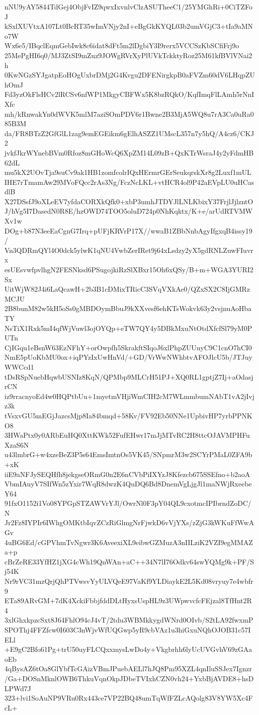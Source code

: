 nNU9yAY5844TdGej4ObjFvIZ9qwxIxvnlvClzASUTheeC1/25YMGhRi+0CiTZFoJ
kSxlXUVtxA107Lt0BcRT35wImVNjy2nI+eBgGkKYQL03b2umVGjC3+tIa9aMNo7W
Wx6e5/IBqclEqmGebIwk8c6idat8dFt5m2lDgbiY3I9rerx5VCCSzKbSCfiFrj9o
25MePgHI6q0/MJ3ZtSI9mZuz9JOWgRVrXyPlUVkTckktyRoz25M61kfBVlVNai2h
0KwNGzSYJgatpEoHOgUxbrDMj2G4Kvgu2DFENirgkpB0aFVZm60dV6LHqpZUhOmJ
Fd3yzOkFlsHCv2lRCSv6nfWP1MkgyCBFWx5K8bzRQkO/KqfImqFlLAmh5rNnIXfc
mh/kRnwakYn0dWVK5mlM7aziSOmPDV6r1Bwne2B3MjA5WQ8u7rA3Ca0uRa085B3M
da/FR8BTzZ2GfGlL1zag9emEGEikm6gElhASZZ1UMscL357n7y5hQ/A4cz6/CKJ2
jvkfJkrWYnebBVm0Rfoz8mGHoWcQ6XpZM14L09zB+QxKTrWsraJ4y2yFdmHB62dL
mu5kX2UOvTja9suCv9ak1HB1zomfcolrIQxHErmrGErSeukqrskXr8g2Luxf1mUL
IHE7rTmamAw29MVoFQcc2rAs3Ng/FczNcLKL+vtHCR4ol9P42aEVpLU0uHCasdlB
X27DSsfJ9oXLeEV7yfdaCORXkQfk0+xbP3umhJTDYJlLNLKbixY37FrjlJjlzntO
J/hVg5I7DasedN0R8E/hzOWD74TOO5oluD724p0NhKqktx/K+e/arUdRTVMWXv1w
DOg+b87N3eeEaCgnG7Irq+pUFjKRVrP17X//wwaB1ZBbNnbAgyIfgxqB4issy19/
Vn3QDRmQYl4O0dck5ylwK1qNU4VwbZerIRet9j64xLsdzy2yX5gdRNLZuwFIuvrx
esUEsvwfpvlhgN2FESNksd6PSugojkiRzSlXBxr15Oh6xQSy/B+m+WGA3YURI2Sx
UitWjW82J4i6LaQcawH+2b3B1cDMixTRicC3SVqVXkAe0/QZxSX2C8IjGMRzMCJU
2B8bunM82w5kH5oSs0gMBDOymBbuJ9kXXvesf6ehKTsWokvk63y2vsjnuAoHbaTY
NsTiX1Rxk5mI4qfWjVuwl3ojOYQp+eTW7QY4y5DBkMxuNtOtdXfcfSl79yM0PUTn
CjIGqu1eBsnW63EzNFhY+orOwpfh5SkrakftSIqoJ6xlPhpZUUuyC9C1cnO7hCI0
NmE5pUoKbMU0ox+iqPYzIxUwHnVd/+GD/VrWwNWhbtvAFOJlcU5b/JTJuyWWCcd1
tDsRSpNuebHqwbUSNIz8KqN/QPMbp9MLCrH51PJ+XQ0RL1gptjZ7Ij+aOdasjrCN
iz9rracnyoEd4w0HQPtbUu+1myetmVHjiWmCIH2cM7WLmmbumNAbT1vA2jIvjz3k
tVsxvGU5mEGjJazcsMjp8Ia84bmqd+58Kv/FV92Eb50NNe1UpbivHP7yrbPPNKO8
3HWaPtx0y0ARbEuHQ0XttKWk52FufEHwr17mJjMTvRC2H8ttcOJAVMPHFuXzaS6N
u43lmbrG+w4xzeBeZ3P5s64EmsImtnOs5VK45/SNpmrM3w2SCYrPMaL0ZFA9b+xK
iiE9aNFJySEQHfh8jekgseORmG0n2E6nCVbPiIXYzJ8Kfezcb675SSEfno+b2aoA
VbmIAuyV7SIfWn5zYxir7WqR8dwzK4QuDQ6Bd8DnemVgLjgJl1maNWjRxeebeY64
91fxO1152i1Vo08YPGpSTZAWVrYJl/OwrNl0F3pY04QL9cxotmcIPIbrndZoDC/N
Jr2Fz8IYPIr6IWhgOMKtbIqvZCzRiGlmgNrFjwkD6vVjYXs/zZjG3kWKuFfWwAGv
4uBG6Ed/cGPVhmTvNgwr3K6AveexiXL9eibwGZMuzA3nIILziK2VZI9egMMAZa+p
cBrZeRE33YfHZ1jXG4cWh19QnWAn+aC++34N7lI76Odkv64swYQMg9k+PF/Sj54K
Nr9rVC31mzQrjQhPTVwsvYyULVQeE97VaKf9YLDiaykE2L5Kd08vryuy7e4wbfr9
ETa89ARvGM+7dK4XckiFbbjfddDLtHyxsUspHL9z3UWpwvcfcFEjzal8TfHnt2R4
3xlGhxkpzcSxt8J64FhlO94cJ4vT/2tdu3WBMkkygdWNrd0OIvb/S2tLA92fwxmP
SPOThj4FFZfcw0I603C3nWjvWfUQGwp5yR9cbVAz1u3hiGxuNQhOJOB31c57IELl
+E9gC2Bfo61Pg+trU50uyFLCQxxmysLwDo4y+Vkgbrhh6lyUcUVGvhV69zGAaoEb
4qBysAZ6tOa8GlYbfTcGAizVBmJPuebAELl7hJQ8Pm95XZL4qnIluSSJex7Ignzr
/Ga+DOSnMknlOWB6ThkuVqnOkpJDbeTVIxhCZN0vh24+YxbBjAVDE8+hsDLPWd7J
323+lvi1SoAuNP9VRu0Rx443ce7VP22BQ48umTqWfFZLcAQolg83V8YW5Xc4FcL+
